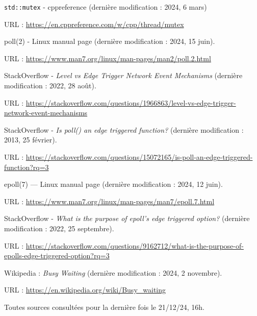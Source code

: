 \documentclass{article}
\begin{document}
\begin{thebibliography}{999}
    \texttt{std::mutex} - cppreference (dernière modification : 2024, 6 mars)

    URL : \url{https://en.cppreference.com/w/cpp/thread/mutex}

    poll(2) - Linux manual page (dernière modification : 2024, 15 juin).

    URL : \url{https://www.man7.org/linux/man-pages/man2/poll.2.html}


    StackOverflow - \textit{Level vs Edge Trigger Network Event Mechanisms} (dernière modification : 2022, 28 août).

    URL : \url{https://stackoverflow.com/questions/1966863/level-vs-edge-trigger-network-event-mechanisms}

    StackOverflow - \textit{Is poll() an edge triggered function?} (dernière modification : 2013, 25 février).

    URL : \url{https://stackoverflow.com/questions/15072165/is-poll-an-edge-triggered-function?rq=3}

    epoll(7) — Linux manual page (dernière modification : 2024, 12 juin).

    URL : \url{https://www.man7.org/linux/man-pages/man7/epoll.7.html}

    StackOverflow - \textit{What is the purpose of epoll's edge triggered option?} (dernière modification : 2022, 25 septembre).

    URL : \url{https://stackoverflow.com/questions/9162712/what-is-the-purpose-of-epolls-edge-triggered-option?rq=3}

    Wikipedia : \textit{Busy Waiting} (dernière modification : 2024, 2 novembre).

    URL : \url{https://en.wikipedia.org/wiki/Busy_waiting}
\end{thebibliography}
Toutes sources consultées pour la dernière fois le 21/12/24, 16h.
\end{document}
